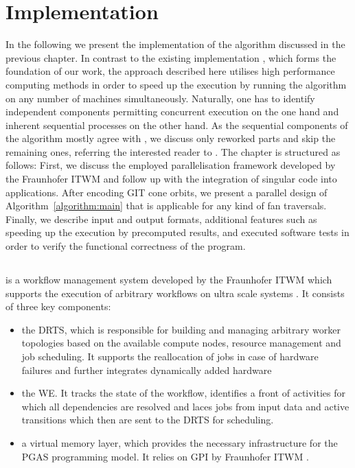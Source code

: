 \chapter{Implementation}

In the following we present the implementation of the algorithm discussed in the previous chapter. In contrast to the existing \singular{} implementation \gitfanlib{} \cite{gitfanlib}, which forms the foundation of our work, the approach described here utilises high performance computing methods in order to speed up the execution by running the algorithm on any number of machines simultaneously. Naturally, one has to identify independent components permitting concurrent execution on the one hand and inherent sequential processes on the other hand. As the sequential components of the algorithm mostly agree with \gitfanlib{}, we discuss only reworked parts and skip the remaining ones, referring the interested reader to \cite{gitfanlib}. The chapter is structured as follows: First, we discuss the employed parallelisation framework \gpispace{} developed by the \ac{Fraunhofer ITWM} and follow up with the integration of singular code into \gpispace{} applications. After encoding GIT cone orbits, we present a parallel design of Algorithm~\ref{algorithm:main} that is applicable for any kind of fan traversals. Finally, we describe input and output formats, additional features such as speeding up the execution by precomputed results, and executed software tests in order to verify the functional correctness of the program.

\section{\gpispace}

\gpispace{} is a workflow management system developed by the \ac{Fraunhofer ITWM} which supports the execution of arbitrary workflows on ultra scale systems \cite{gpispace}. It consists of three key components: 
\begin{itemize}
	\item the \ac{DRTS}, which is responsible for building and managing arbitrary worker topologies based on the available compute nodes, resource management and job scheduling. It supports the reallocation of jobs in case of hardware failures and further integrates dynamically added hardware
	\item the \ac{WE}. It tracks the state of the workflow, identifies a front of activities for which all dependencies are resolved and laces jobs from input data and active transitions which then are sent to the \ac{DRTS} for scheduling.
	\item a virtual memory layer, which provides the necessary infrastructure for the \ac{PGAS} programming model. It relies on \textsc{GPI} by \ac{Fraunhofer ITWM} \cite{gpi}.
\end{itemize}

